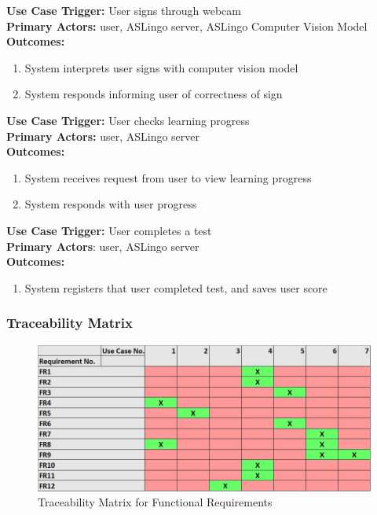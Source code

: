 \documentclass[12pt, titlepage]{article}
\begin{document}
  \textbf{Use Case Trigger:} User signs through webcam\\
  \textbf{Primary Actors:} user, ASLingo server, ASLingo Computer Vision Model\\
  \textbf{Outcomes:}
  \begin{enumerate}
      \item System interprets user signs with computer vision model
      \item System responds informing user of correctness of sign
  \end{enumerate}
  \textbf{Use Case Trigger:} User checks learning progress\\
  \textbf{Primary Actors:} user, ASLingo server\\
  \textbf{Outcomes:}
  \begin{enumerate}
      \item System receives request from user to view learning progress
      \item System responds with user progress
  \end{enumerate}
  \textbf{Use Case Trigger:} User completes a test\\
  \textbf{Primary Actors}: user, ASLingo server\\
  \textbf{Outcomes:}
  \begin{enumerate}
      \item System registers that user completed test, and saves user score
  \end{enumerate}

\subsubsection{Traceability Matrix}

\begin{figure}[H]
    \centering
     \includegraphics[scale=0.5]{SRS_Traceability_Matrix.jpg}
    \caption{Traceability Matrix for Functional Requirements}
\end{figure}
\end{document}
